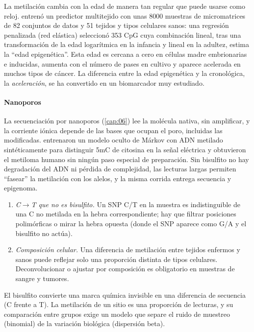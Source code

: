 La metilación cambia con la edad de manera tan regular que puede usarse como reloj. \textcite{c13-horvath2013} entrenó un predictor multitejido con unas \num{8000} muestras de micromatrices de 82 conjuntos de datos y 51 tejidos y tipos celulares sanos: una regresión penalizada (red elástica) seleccionó 353 CpG cuya combinación lineal, tras una transformación de la edad logarítmica en la infancia y lineal en la adultez, estima la ``edad epigenética''. Esta edad es cercana a cero en células madre embrionarias e inducidas, aumenta con el número de pases en cultivo y aparece acelerada en muchos tipos de cáncer. La diferencia entre la edad epigenética y la cronológica, la \emph{aceleración}, se ha convertido en un biomarcador muy estudiado.

\paragraph{Nanoporos} La secuenciación por nanoporos (\cref{cap:06}) lee la molécula nativa, sin amplificar, y la corriente iónica depende de las bases que ocupan el poro, incluidas las modificadas. \textcite{c13-simpson2017} entrenaron un modelo oculto de Márkov con ADN metilado sintéticamente para distinguir 5mC de citosina en la señal eléctrica y obtuvieron el metiloma humano sin ningún paso especial de preparación. Sin bisulfito no hay degradación del ADN ni pérdida de complejidad, las lecturas largas permiten ``fasear'' la metilación con los alelos, y la misma corrida entrega secuencia y epigenoma.

\begin{cuidado}
\begin{enumerate}
  \item \emph{C$\to$T que no es bisulfito.} Un SNP C/T en la muestra es indistinguible de una C no metilada en la hebra correspondiente; hay que filtrar posiciones polimórficas o mirar la hebra opuesta (donde el SNP aparece como G/A y el bisulfito no actúa).
  \item \emph{Composición celular.} Una diferencia de metilación entre tejidos enfermos y sanos puede reflejar solo una proporción distinta de tipos celulares. Deconvolucionar o ajustar por composición es obligatorio en muestras de sangre y tumores.
\end{enumerate}
\end{cuidado}

\begin{ideaclave}
El bisulfito convierte una marca química invisible en una diferencia de secuencia (C frente a T). La metilación de un sitio es una proporción de lecturas, y su comparación entre grupos exige un modelo que separe el ruido de muestreo (binomial) de la variación biológica (dispersión beta).
\end{ideaclave}

